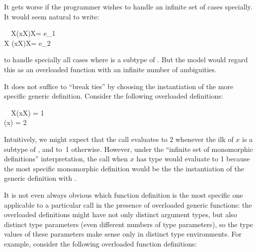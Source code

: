 \documentclass[10pt]{sigplanconf}
\begin{document}
It gets worse if the programmer wishes to handle an infinite set of cases specially.  
It would seem natural to write:

\small
\begin{FortressCode}
{\tt ~~}\+\llbracket{}X\rrbracket\bigl(x\COLON {}\llbracket{}X\rrbracket\bigr)\COLON {}\llbracket{}X\rrbracket = e_1 \\
  \llbracket{}X \SHORTCUT{<} \rrbracket\bigl(x\COLON {}\llbracket{}X\rrbracket\bigr)\COLON {}\llbracket{}X\rrbracket = e_2\-
\end{FortressCode}
\normalsize
to handle specially all cases where  is a subtype of .
But the model would regard this as an overloaded function
with an infinite number of ambiguities.

It does not suffice to  ``break ties''
by choosing the instantiation of the more specific generic definition.
Consider the following overloaded definitions:

\small
\begin{FortressCode}
{\tt ~~}\+\llbracket{}X\rrbracket(x\COLON X)\COLON {} = 1 \\
  (x\COLON {})\COLON {} = 2\-
\end{FortressCode}
\normalsize
Intuitively, we might expect that
the call  evaluates to 2 whenever the ilk of $x$ is a subtype of ,
and to~1 otherwise.
However,
under the ``infinite set of monomorphic definitions'' interpretation,
the call  when $x$ has type  would evaluate to 1
because the most specific monomorphic definition
would be the the instantiation of the generic definition with .


It is not even always obvious 
which function definition is the most specific one 
applicable to a particular call
in the presence of overloaded generic functions: 
the overloaded definitions might have not only distinct argument types, 
but also distinct type parameters 
(even different numbers of type parameters), 
so the type values of these parameters 
make sense only in distinct type environments. 
For example, 
consider the following overloaded function definitions:
\end{document}
